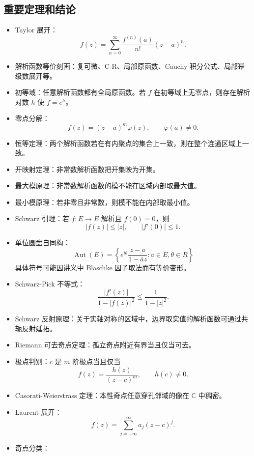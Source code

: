 \documentclass{article}
\newcommand{\C}{\mathbb{C}}
\begin{document}
\subsection{重要定理和结论}

\begin{itemize}
\item
  Taylor 展开： \[
  f(z)=\sum_{n=0}^{\infty}\frac{f^{(n)}(a)}{n!}(z-a)^n.
  \]
\item
  解析函数等价刻画：复可微、C-R、局部原函数、Cauchy
  积分公式、局部幂级数展开等。
\item
  初等域：任意解析函数都有全局原函数。若 $f$
  在初等域上无零点，则存在解析对数 $h$ 使 $f=e^h$。
\item
  零点分解： \[
  f(z)=(z-a)^m\varphi(z),\qquad \varphi(a)\ne 0.
  \]
\item
  恒等定理：两个解析函数若在有内聚点的集合上一致，则在整个连通区域上一致。
\item
  开映射定理：非常数解析函数把开集映为开集。
\item
  最大模原理：非常数解析函数的模不能在区域内部取最大值。
\item
  最小模原理：若非零且非常数，则模不能在内部取最小值。
\item
  Schwarz 引理：若 $f:E\to E$ 解析且
  $f(0)=0$，则 \[
  |f(z)|\le |z|,\qquad |f'(0)|\le 1.
  \]
\item
  单位圆盘自同构： \[
  \operatorname{Aut}(E)=
  \left\{e^{i\theta}\frac{z-a}{1-\bar a z}:a\in E,\theta\in R\right\}
  \] 具体符号可能因讲义中 Blaschke 因子取法而有等价变形。
\item
  Schwarz-Pick 不等式： \[
  \frac{|f'(z)|}{1-|f(z)|^2}\le \frac{1}{1-|z|^2}.
  \]
\item
  Schwarz
  反射原理：关于实轴对称的区域中，边界取实值的解析函数可通过共轭反射延拓。
\item
  Riemann 可去奇点定理：孤立奇点附近有界当且仅当可去。
\item
  极点判别：$c$ 是 $m$ 阶极点当且仅当 \[
  f(z)=\frac{h(z)}{(z-c)^m},\qquad h(c)\ne 0.
  \]
\item
  Casorati-Weierstrass 定理：本性奇点任意穿孔邻域的像在 $\C$
  中稠密。
\item
  Laurent 展开： \[
  f(z)=\sum_{j=-\infty}^{\infty}a_j(z-c)^j.
  \]
\item
  奇点分类：


\end{itemize}
\end{document}
